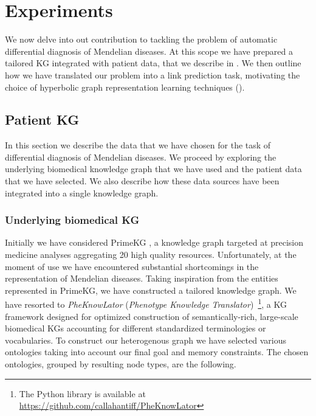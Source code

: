 \chapter{Experiments}
We now delve into out contribution to tackling the problem of automatic differential diagnosis of Mendelian diseases. At this scope we have prepared a tailored KG integrated with patient data, that we describe in . We then outline how we have translated our problem into a link prediction task, motivating the choice of hyperbolic graph representation learning techniques (). 

\section{Patient KG}\label{sec:patientKG}
In this section we describe the data that we have chosen for the task of differential diagnosis of Mendelian diseases. We proceed by exploring the underlying biomedical knowledge graph that we have used and the patient data that we have selected. We also describe how these data sources have been integrated into a single knowledge graph.

\subsection{Underlying biomedical KG}\label{sec:underlyingKG}
Initially we have considered PrimeKG \cite{chandak2023PrimeKG}, a knowledge graph targeted at precision medicine analyses aggregating 20 high quality resources. Unfortunately, at the moment of use we have encountered substantial shortcomings in the representation of Mendelian diseases. Taking inspiration from the entities represented in PrimeKG, we have constructed a tailored knowledge graph. We have resorted to \emph{PheKnowLator} (\emph{Phenotype Knowledge Translator})~\cite{callahan2020PheKnowlator}\footnote{The Python library is available at \url{https://github.com/callahantiff/PheKnowLator}}, a KG framework designed for optimized construction of semantically-rich, large-scale biomedical KGs accounting for different standardized terminologies or vocabularies. To construct our heterogenous graph we have selected various ontologies taking into account our final goal and memory constraints. The chosen ontologies, grouped by resulting node types, are the following.


